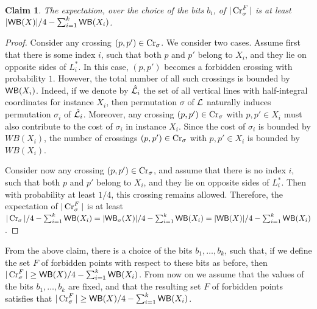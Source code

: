 \documentclass[11pt]{article}
\numberwithin{equation}{section}
\newtheorem{claim}[theorem]{Claim}
\theoremstyle{definition}
\theoremstyle{plain}
\begin{document}
\begin{claim}\label{claim: many expected crossings}
	The expectation, over the choice of the bits $b_i$, of $|\operatorname{Cr}^F_{\sigma}|$ is at least $|\mathsf{WB}(X)|/4-\sum_{i=1}^k\mathsf{WB}(X_i)$.
\end{claim}

\begin{proof}
	Consider any crossing $(p,p')\in \operatorname{Cr}_{\sigma}$. We consider two cases. Assume first that there is some index $i$, such that both $p$ and $p'$ belong to $X_i$, and they lie on opposite sides of $L^*_i$. In this case, $(p,p')$ becomes a forbidden crossing with probability $1$. However, the total number of all such crossings is bounded by $\mathsf{WB}(X_i)$. Indeed, if we denote by $\hat{\mathcal{L}}_i$ the set of all vertical lines with half-integral coordinates for instance $X_i$, then permutation $\sigma$ of ${\mathcal L}$ naturally induces permutation $\sigma_i$ of $\hat{\mathcal{L}}_i$. Moreover, any crossing $(p,p')\in\operatorname{Cr}_{\sigma}$ with $p,p'\in X_i$ must also contribute to the cost of $\sigma_i$ in instance $X_i$. Since the cost of $\sigma_i$ is bounded by $WB(X_i)$, the number of crossings  $(p,p')\in \operatorname{Cr}_{\sigma}$ with $p,p'\in X_i$ is bounded by $WB(X_i)$.
	
	Consider now any crossing $(p,p')\in \operatorname{Cr}_{\sigma}$, and assume that there is no  index $i$, such that both $p$ and $p'$ belong to $X_i$, and they lie on opposite sides of $L^*_i$. Then with probability at least $1/4$, this crossing remains allowed. Therefore, the expectation of $|\operatorname{Cr}^F_{\sigma}|$ is at least $|\operatorname{Cr}_{\sigma}|/4-\sum_{i=1}^k\mathsf{WB}(X_i)=|\mathsf{WB}_{\sigma}(X)|/4-\sum_{i=1}^k\mathsf{WB}(X_i)=|\mathsf{WB}(X)|/4-\sum_{i=1}^k\mathsf{WB}(X_i) $.
\end{proof}


From the above claim, there is a choice of the bits $b_1,\ldots,b_k$, such that, if we define the set $F$ of forbidden points with respect to these bits as before, then $|\operatorname{Cr}^F_{\sigma}|\geq \mathsf{WB}(X)/4-\sum_{i=1}^k\mathsf{WB}(X_i)$. From now on we assume that the values of the bits $b_1,\ldots,b_k$ are fixed, and that the resulting set $F$ of forbidden points satisfies that $|\operatorname{Cr}^F_{\sigma}|\geq \mathsf{WB}(X)/4-\sum_{i=1}^k\mathsf{WB}(X_i)$.


%
%
%
%
\end{document}
